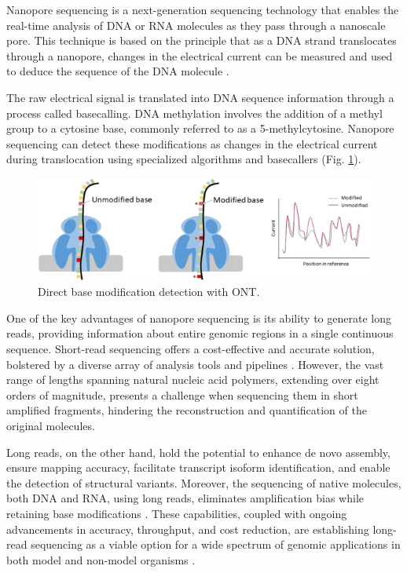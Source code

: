 Nanopore sequencing is a next-generation sequencing technology that enables the real-time analysis of DNA or RNA molecules as they pass through a nanoscale pore. This technique is based on the principle that as a DNA strand translocates through a nanopore, changes in the electrical current can be measured and used to deduce the sequence of the DNA molecule \cite{ont}. 

The raw electrical signal is translated into DNA sequence information through a process called basecalling. DNA methylation involves the addition of a methyl group to a cytosine base, commonly referred to as a 5-methylcytosine. Nanopore sequencing can detect these modifications as changes in the electrical current during translocation using specialized algorithms and basecallers (Fig. \ref{ont_epi}).

\begin{figure}[ht]
	\begin{center}
		\includegraphics[width = \textwidth]{Fig/ont_epi.png}
	\end{center}
	\caption{Direct base modification detection with \acs{ONT}.}\label{ont_epi}
\end{figure}

One of the key advantages of nanopore sequencing is its ability to generate long reads, providing information about entire genomic regions in a single continuous sequence. Short-read sequencing offers a cost-effective and accurate solution, bolstered by a diverse array of analysis tools and pipelines \citep{short_reads}. However, the vast range of lengths spanning natural nucleic acid polymers, extending over eight orders of magnitude, presents a challenge when sequencing them in short amplified fragments, hindering the reconstruction and quantification of the original molecules. 

Long reads, on the other hand, hold the potential to enhance de novo assembly, ensure mapping accuracy, facilitate transcript isoform identification, and enable the detection of structural variants. Moreover, the sequencing of native molecules, both DNA and RNA, using long reads, eliminates amplification bias while retaining base modifications \citep{long_read_adv}. These capabilities, coupled with ongoing advancements in accuracy, throughput, and cost reduction, are establishing long-read sequencing as a viable option for a wide spectrum of genomic applications in both model and non-model organisms \citep{long_read_adv2}.

